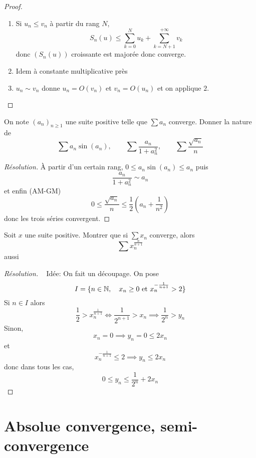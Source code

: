 \begin{proof}~
    \begin{enumerate}
        \item Si $u_n\leq v_n$ à partir du rang $N$, \[
                S_n(u)\leq \sum_{k=0}^Nu_k+\sum_{k=N+1}^{+\infty}v_k
            \]
            donc $(S_n(u))$ croissante est majorée donc converge.
        \item Idem à constante multiplicative près
        \item $u_n\sim v_n$ donne $u_n=O(v_n)$ et $v_n=O(u_n)$ et on applique $2$.
    \end{enumerate}
\end{proof}

\begin{exo}
    On note $(a_n)_{n\geq 1}$ une suite positive telle que $\sum a_n$ converge. Donner la nature de \[
        \sum a_n\sin(a_n), \qquad \sum\frac{a_n}{1+a_n^2}, \qquad \sum\frac{\sqrt{a_n}}{n}
    \]
\end{exo}

\begin{proof}[Résolution]
    À partir d'un certain rang, $0\leq a_n\sin(a_n)\leq a_n$ puis \[
        \frac{a_n}{1+a_n^2}\sim a_n
    \]
    et enfin (AM-GM) \[
        0\leq \frac{\sqrt{a_n}}n\leq\frac12 \left( a_n+\frac1{n^2} \right)
    \]
    donc les trois séries convergent.
\end{proof}

\begin{exo}[X]
    Soit $x$ une suite positive. Montrer que si $\sum x_n$ converge, alors \[
        \sum x_n^{\frac n{n+1}}
    \]
    aussi
\end{exo}

\begin{proof}[Résolution]~
    Idée: On fait un découpage. On pose \[
        I=\{n\in\mathbb N, \quad x_n\geq 0 \text{ et }x_n^{-\frac1{n+1}}>2\}
    \]
    Si $n\in I$ alors \[
        \frac12>x_n^{\frac1{n+1}}\iff \frac1{2^{n+1}}>x_n\implies \frac1{2^n}>y_n
    \]
    Sinon, \[
        x_n=0\implies y_n=0\leq 2x_n
    \]
    et \[
        x_n^{-\frac1{n+1}}\leq 2\implies y_n\leq 2x_n
    \]
    donc dans tous les cas, \[
        0\leq y_n\leq \frac1{2^n}+2x_n
    \]
\end{proof}

\section{Absolue convergence, semi-convergence}

